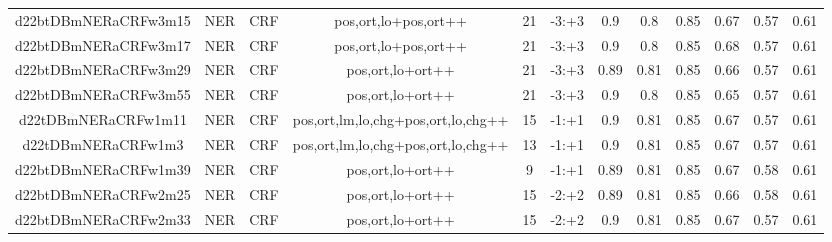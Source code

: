 \documentclass[a4paper]{article}
\begin{document}
\begin{landscape}
\begin{center}
\begin{tabular}{ |c|c|c|c|c|c|c|c|c|c|c|c|}
 
 	
 	\small{ d22btDBmNERaCRFw3m15 } & \small{ NER} & \small{  CRF }  & pos,ort,lo+pos,ort++  &  21 &  \small{  -3:+3 }  &  0.9 & 0.8 & 0.85  &  0.67 & 0.57 & 0.61 \\
 	

 
 	
 	\small{ d22btDBmNERaCRFw3m17 } & \small{ NER} & \small{  CRF }  & pos,ort,lo+pos,ort++  &  21 &  \small{  -3:+3 }  &  0.9 & 0.8 & 0.85  &  0.68 & 0.57 & 0.61 \\
 	

 
 	
 	\small{ d22btDBmNERaCRFw3m29 } & \small{ NER} & \small{  CRF }  & pos,ort,lo+ort++  &  21 &  \small{  -3:+3 }  &  0.89 & 0.81 & 0.85  &  0.66 & 0.57 & 0.61 \\
 	

 
 	
 	\small{ d22btDBmNERaCRFw3m55 } & \small{ NER} & \small{  CRF }  & pos,ort,lo+ort++  &  21 &  \small{  -3:+3 }  &  0.9 & 0.8 & 0.85  &  0.65 & 0.57 & 0.61 \\
 	

 
 	
 	\small{ d22tDBmNERaCRFw1m11 } & \small{ NER} & \small{  CRF }  & pos,ort,lm,lo,chg+pos,ort,lo,chg++  &  15 &  \small{  -1:+1 }  &  0.9 & 0.81 & 0.85  &  0.67 & 0.57 & 0.61 \\
 	

 
 	
 	\small{ d22tDBmNERaCRFw1m3 } & \small{ NER} & \small{  CRF }  & pos,ort,lm,lo,chg+pos,ort,lo,chg++  &  13 &  \small{  -1:+1 }  &  0.9 & 0.81 & 0.85  &  0.67 & 0.57 & 0.61 \\
 	

 
 	
 	\small{ d22btDBmNERaCRFw1m39 } & \small{ NER} & \small{  CRF }  & pos,ort,lo+ort++  &  9 &  \small{  -1:+1 }  &  0.89 & 0.81 & 0.85  &  0.67 & 0.58 & 0.61 \\
 	

 
 	
 	\small{ d22btDBmNERaCRFw2m25 } & \small{ NER} & \small{  CRF }  & pos,ort,lo+ort++  &  15 &  \small{  -2:+2 }  &  0.89 & 0.81 & 0.85  &  0.66 & 0.58 & 0.61 \\
 	

 
 	
 	\small{ d22btDBmNERaCRFw2m33 } & \small{ NER} & \small{  CRF }  & pos,ort,lo+ort++  &  15 &  \small{  -2:+2 }  &  0.9 & 0.81 & 0.85  &  0.67 & 0.57 & 0.61 \\
 	


\end{tabular}
\end{center}
\end{landscape}
\end{document}
